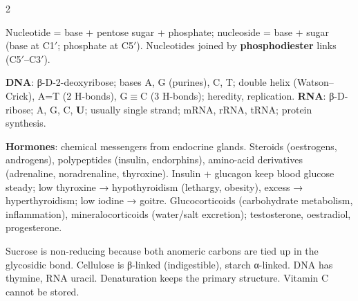 \documentclass[9pt,a4paper]{extarticle}
\begin{document}
\begin{multicols}{2}
\begin{fl}
\item Nucleotide = base + pentose sugar + phosphate; nucleoside = base + sugar (base at C1$'$; phosphate at C5$'$). Nucleotides joined by \textbf{phosphodiester} links (C5$'$--C3$'$).
\item \textbf{DNA}: β-D-2-deoxyribose; bases A, G (purines), C, T; double helix (Watson--Crick), A=T (2 H-bonds), G$\equiv$C (3 H-bonds); heredity, replication. \textbf{RNA}: β-D-ribose; A, G, C, \textbf{U}; usually single strand; mRNA, rRNA, tRNA; protein synthesis.
\item \textbf{Hormones}: chemical messengers from endocrine glands. Steroids (oestrogens, androgens), polypeptides (insulin, endorphins), amino-acid derivatives (adrenaline, noradrenaline, thyroxine). Insulin + glucagon keep blood glucose steady; low thyroxine → hypothyroidism (lethargy, obesity), excess → hyperthyroidism; low iodine → goitre. Glucocorticoids (carbohydrate metabolism, inflammation), mineralocorticoids (water/salt excretion); testosterone, oestradiol, progesterone.
\end{fl}
\begin{tip}\Tip Sucrose is non-reducing because both anomeric carbons are tied up in the glycosidic bond. Cellulose is β-linked (indigestible), starch α-linked. DNA has thymine, RNA uracil. Denaturation keeps the primary structure. Vitamin C cannot be stored.\end{tip}
\end{multicols}
\end{document}

